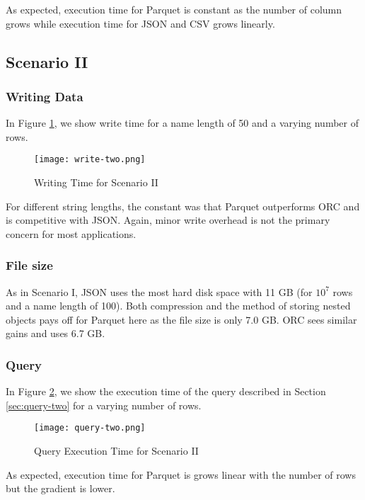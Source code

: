As expected, execution time for Parquet is constant as the number of column grows while execution time for JSON and CSV grows linearly.

\subsection{Scenario II}

\subsubsection{Writing Data}
In Figure \ref{fig:write-two}, we show write time for a name length of 50 and a varying number of rows.

\begin{figure}[!htb]
\caption{Writing Time for Scenario II}
\centering
\texttt{[image: write-two.png]}
\label{fig:write-two}
\end{figure}

For different string lengths, the constant was that Parquet outperforms ORC and is competitive with JSON.
Again, minor write overhead is not the primary concern for most applications.

\subsubsection{File size}
As in Scenario I, JSON uses the most hard disk space with 11 GB (for $10^7$ rows and a name length of 100).
Both compression and the method of storing nested objects pays off for Parquet here as the file size is only 7.0 GB.
ORC sees similar gains and uses 6.7 GB.

\subsubsection{Query}
In Figure \ref{fig:query-two}, we show the execution time of the query described in Section \ref{sec:query-two} for a varying number of rows.

\begin{figure}[!htb]
\caption{Query Execution Time for Scenario II}
\centering
\texttt{[image: query-two.png]}
\label{fig:query-two}
\end{figure}

As expected, execution time for Parquet is grows linear with the number of rows but the gradient is lower.

\newpage

